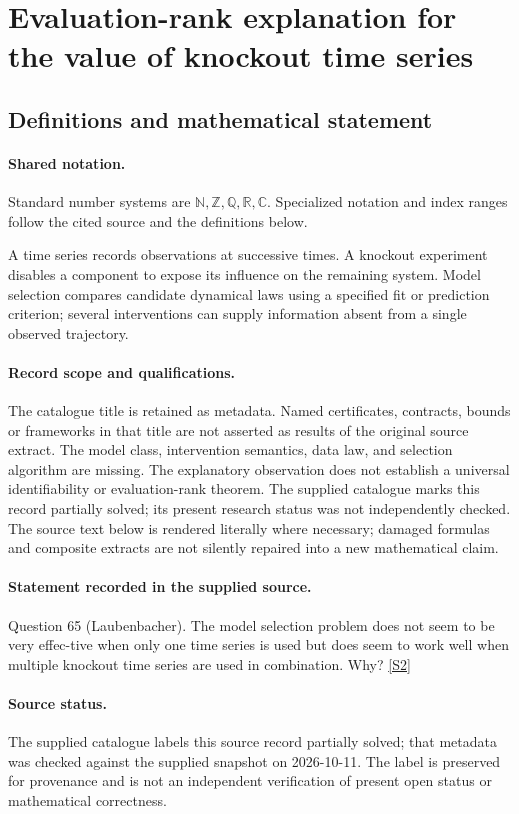 \documentclass[11pt]{article}
\newcommand{\sref}[2]{\hyperlink{source:#1:#2}{[S#2]}}
\begin{document}
\section{Evaluation-rank explanation for the value of knockout time series}\label{statement}

\subsection{Definitions and mathematical statement}

\paragraph{Shared notation.}Standard number systems are $\mathbb N,\mathbb Z,\mathbb Q,\mathbb R,\mathbb C$. Specialized notation and index ranges follow the cited source and the definitions below.


A time series records observations at successive times. A knockout experiment disables a component to expose its influence on the remaining system. Model selection compares candidate dynamical laws using a specified fit or prediction criterion; several interventions can supply information absent from a single observed trajectory.
\paragraph{Record scope and qualifications.}
The catalogue title is retained as metadata. Named certificates, contracts, bounds or frameworks in that title are not asserted as results of the original source extract.
The model class, intervention semantics, data law, and selection algorithm are missing. The explanatory observation does not establish a universal identifiability or evaluation-rank theorem. The supplied catalogue marks this record partially solved; its present research status was not independently checked.
The source text below is rendered literally where necessary; damaged formulas and composite extracts are not silently repaired into a new mathematical claim.
\paragraph{Statement recorded in the supplied source.}
Question 65 (Laubenbacher). The model selection problem does not seem to be very effec-tive when only one time series is used but does seem to work well when multiple knockout time series are used in combination. Why? \sref{statement}{2}
\paragraph{Source status.}
The supplied catalogue labels this source record partially solved; that metadata was checked against the supplied snapshot on 2026-10-11. The label is preserved for provenance and is not an independent verification of present open status or mathematical correctness.
\end{document}
